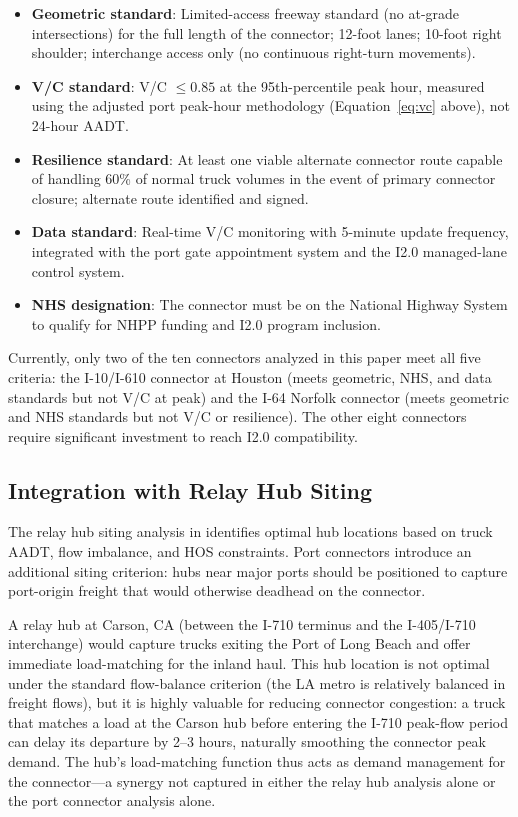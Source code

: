 \begin{itemize}
  \item \textbf{Geometric standard}: Limited-access freeway standard (no at-grade intersections) for the full length of the connector; 12-foot lanes; 10-foot right shoulder; interchange access only (no continuous right-turn movements).
  \item \textbf{V/C standard}: V/C $\leq 0.85$ at the 95th-percentile peak hour, measured using the adjusted port peak-hour methodology (Equation~\ref{eq:vc} above), not 24-hour AADT.
  \item \textbf{Resilience standard}: At least one viable alternate connector route capable of handling 60\% of normal truck volumes in the event of primary connector closure; alternate route identified and signed.
  \item \textbf{Data standard}: Real-time V/C monitoring with 5-minute update frequency, integrated with the port gate appointment system and the I2.0 managed-lane control system.
  \item \textbf{NHS designation}: The connector must be on the National Highway System to qualify for NHPP funding and I2.0 program inclusion.
\end{itemize}

Currently, only two of the ten connectors analyzed in this paper meet all five criteria: the I-10/I-610 connector at Houston (meets geometric, NHS, and data standards but not V/C at peak) and the I-64 Norfolk connector (meets geometric and NHS standards but not V/C or resilience). The other eight connectors require significant investment to reach I2.0 compatibility.

\subsection{Integration with Relay Hub Siting}

The relay hub siting analysis in \citet{ROUTE_C1} identifies optimal hub locations based on truck AADT, flow imbalance, and HOS constraints. Port connectors introduce an additional siting criterion: hubs near major ports should be positioned to capture port-origin freight that would otherwise deadhead on the connector.

A relay hub at Carson, CA (between the I-710 terminus and the I-405/I-710 interchange) would capture trucks exiting the Port of Long Beach and offer immediate load-matching for the inland haul. This hub location is not optimal under the standard flow-balance criterion (the LA metro is relatively balanced in freight flows), but it is highly valuable for reducing connector congestion: a truck that matches a load at the Carson hub before entering the I-710 peak-flow period can delay its departure by 2--3 hours, naturally smoothing the connector peak demand. The hub's load-matching function thus acts as demand management for the connector---a synergy not captured in either the relay hub analysis alone or the port connector analysis alone.
